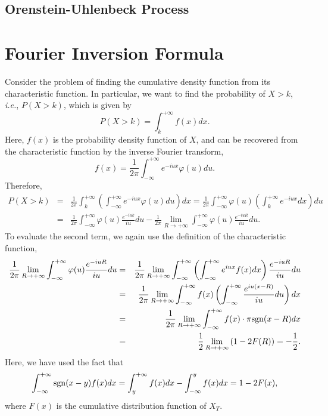 \documentclass[12pt]{article}
\begin{document}
  \subsection{Orenstein-Uhlenbeck Process}


\section{Fourier Inversion Formula}

  Consider the problem of finding the cumulative density function from its characteristic function. 
  In particular, we want to find the probability of $X>k$, {\it i.e.}, $P(X>k)$, which is given by
  \begin{equation}
    P(X > k)=\int_k^{+\infty}f(x)dx.
  \end{equation}
  Here, $f(x)$ is the probability density function of $X$, and can be recovered from the characteristic function
  by the inverse Fourier transform,
  \begin{equation}
    f(x)=\frac{1}{2\pi}\int_{-\infty}^{+\infty}e^{-iux}\varphi(u)du.
  \end{equation}
  Therefore,
  \begin{eqnarray}
    P(X > k)&=&\frac{1}{2\pi}\int_k^{+\infty} \left(\int_{-\infty}^{+\infty}e^{-iux}\varphi(u)du\right)dx
                        =\frac{1}{2\pi}\int_{-\infty}^{+\infty}\varphi(u) \left(\int_k^{+\infty}e^{-iux}dx\right)du\nonumber\\
                   &=&\frac{1}{2\pi}\int_{-\infty}^{+\infty}\varphi(u)\frac{e^{-iuk}}{iu}du
                        - \frac{1}{2\pi}\lim_{R\rightarrow +\infty}\int_{-\infty}^{+\infty}\varphi(u)\frac{e^{-iuR}}{iu}du.
  \end{eqnarray}
  To evaluate the second term, we again use the definition of the characteristic function,
  \begin{eqnarray}
    \frac{1}{2\pi}\lim_{R\rightarrow +\infty}\int_{-\infty}^{+\infty}\varphi(u)\frac{e^{-iuR}}{iu}du
    &=& \frac{1}{2\pi}\lim_{R\rightarrow +\infty}\int_{-\infty}^{+\infty}\left(\int_{-\infty}^{+\infty}e^{iux}f(x)dx\right)\frac{e^{-iuR}}{iu}du\nonumber\\
    &=& \frac{1}{2\pi}\lim_{R\rightarrow +\infty}\int_{-\infty}^{+\infty}f(x)\left(\int_{-\infty}^{+\infty}\frac{e^{iu(x-R)}}{iu}du\right)dx\nonumber\\
    &=& \frac{1}{2\pi}\lim_{R\rightarrow +\infty}\int_{-\infty}^{+\infty}f(x)\cdot\pi {\rm sgn}(x-R)dx\nonumber\\
    &=& \frac{1}{2}\lim_{R\rightarrow +\infty}\left(1-2F(R)\right) = -\frac{1}{2}.
  \end{eqnarray}
  Here, we have used the fact that
  \begin{equation}
    \int_{-\infty}^{+\infty}{\rm sgn}(x-y)f(x)dx=\int_y^{+\infty}f(x)dx - \int_{-\infty}^yf(x)dx = 1-2F(x),
  \end{equation}
  where $F(x)$ is the cumulative distribution function of $X_T$.
\end{document}
